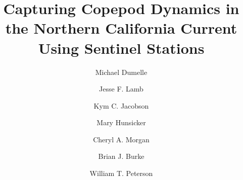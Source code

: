 \documentclass[preprint, authoryear, 12pt]{elsarticle}
\begin{document}
\begin{frontmatter}
\title{Capturing Copepod Dynamics in the Northern California Current Using Sentinel Stations}

\author[1]{Michael Dumelle}
\author[2]{Jesse F. Lamb}
\author[3]{Kym C. Jacobson}
\author[3]{Mary Hunsicker}
\author[4]{Cheryl A. Morgan}
\author[5]{Brian J. Burke}
\author[3]{William T. Peterson}

\address[1]{Department of Statistics, Oregon State University, Corvallis, OR 97331}
\address[2]{Fisheries-Oceanography Coordinated Investigations, National Marine Fisheries Service, Alaska Fisheries Science Center, Seattle, WA 98115, USA}
\address[3]{Fish Ecology Division, National Marine Fisheries Service, Northwest Fisheries Science Center, Newport, OR 97365, USA}
\address[4]{Cooperative Institute for Marine Resources Studies, Hatfield Marine Science Center, Oregon State University, Newport, OR 97365, USA}
\address[5]{Fish Ecology Division, National Marine Fisheries Service, Northwest Fisheries Science Center, Seattle, WA 98112, USA}


\end{frontmatter}
\end{document}
